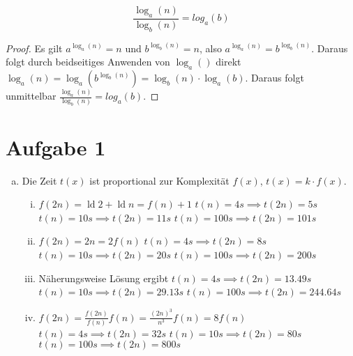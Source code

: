 \documentclass{article}
\newcommand{\ld}{\operatorname{ld}}
\begin{document}
\begin{lemma}
	\[\frac{\log_a(n)}{\log_b(n)} = log_a(b)\]
\end{lemma}
\begin{proof}
	Es gilt $a^{\log_a(n)} = n$ und $b^{\log_b(n)} = n$, also $a^{\log_a(n)} = b^{\log_b(n)}$. Daraus folgt durch beidseitiges Anwenden von $\log_a()$ direkt $\log_a(n) = \log_a(b^{\log_b(n)}) = \log_b(n) \cdot \log_a(b)$. Daraus folgt unmittelbar $\frac{\log_a(n)}{\log_b(n)} = log_a(b)$.
\end{proof}
\section*{Aufgabe 1}
\begin{enumerate}[a)]
	\item Die Zeit $t(x)$ ist proportional zur Komplexität $f(x)$, $t(x) = k\cdot f(x)$.
	\begin{enumerate}[i)]
		\begin{comment}
		\item $t(x) = k\cdot \ld x$. Es ist $4s = t(n) = k\cdot \ld n \implies k = \frac{4s}{\ld n}$. Somit erhalten wir $t(x) = \frac{4s}{\ld n} \cdot \ld x$.
		Für $x = 2n$ ergibt sich $t(2n) = \frac{4s}{\ld n} \cdot \ld(2n) = \frac{4s}{\ld n} \cdot (ld 2 + \ld(n)) = 4s + \frac{4s}{\ld n}$.
		Bei nochmaliger Verdopplung $t(4n) = \frac{4s}{\ld n} \cdot \ld(4n) = \frac{4s}{\ld n} \cdot (ld 4 + \ld(n)) = 4s + 2 \cdot \frac{4s}{\ld n}$ kommt nochmals derselbe Term hinzu. Die Laufzeit nimmt also bei Verdopplung stets um einen konstanten Term zu.
		\end{comment}
		\item $f(2n) = \ld 2 + \ld n = f(n) + 1$
		\subitem $t(n) = 4s \implies t(2n) = 5s$
		\subitem $t(n) = 10s \implies t(2n) = 11s$
		\subitem $t(n) = 100s \implies t(2n) = 101s$
		\item $f(2n) = 2n = 2f(n)$
		\subitem $t(n) = 4s \implies t(2n) = 8s$
		\subitem $t(n) = 10s \implies t(2n) = 20s$
		\subitem $t(n) = 100s \implies t(2n) = 200s$
		\item Näherungsweise Lösung ergibt
		\subitem $t(n) = 4s \implies t(2n) = 13.49 s$
		\subitem $t(n) = 10s \implies t(2n) = 29.13 s$
		\subitem $t(n) = 100s \implies t(2n) = 244.64 s$
		\item $f(2n) = \frac{f(2n)}{f(n)} f(n) = \frac{(2n)^3}{n^3} f(n) = 8 f(n)$\\
		\subitem $t(n) = 4s \implies t(2n) = 32 s$
		\subitem $t(n) = 10s \implies t(2n) = 80 s$
		\subitem $t(n) = 100s \implies t(2n) = 800 s$

\end{enumerate}
\end{enumerate}
\end{document}
